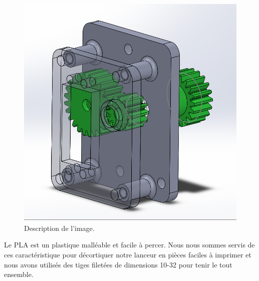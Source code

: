 \begin{figure}[h!]
    \centering
    \includegraphics[width=0.5\linewidth]{img/s2/cad/gearbox2}
    \caption{Description de l'image.}
    \label{fig:s2-cad-gearbox2}
\end{figure}

Le PLA est un plastique malléable et facile à percer.
Nous nous sommes servis de ces caractéristique pour décortiquer notre lanceur en pièces faciles à imprimer et nous avons utilisés des tiges filetées de dimensions 10-32 pour tenir le tout ensemble.


